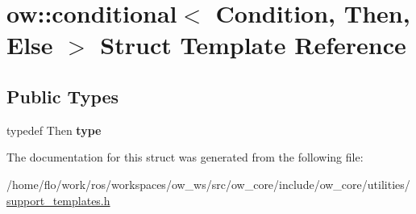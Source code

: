 \hypertarget{structow_1_1conditional}{}\section{ow\+:\+:conditional$<$ Condition, Then, Else $>$ Struct Template Reference}
\label{structow_1_1conditional}
\subsection*{Public Types}
\begin{DoxyCompactItemize}
\item 
typedef Then {\bfseries type}\hypertarget{structow_1_1conditional_a7b51d022cc26591c0338e95e154f5c51}{}\label{structow_1_1conditional_a7b51d022cc26591c0338e95e154f5c51}

\end{DoxyCompactItemize}


The documentation for this struct was generated from the following file\+:\begin{DoxyCompactItemize}
\item 
/home/flo/work/ros/workspaces/ow\+\_\+ws/src/ow\+\_\+core/include/ow\+\_\+core/utilities/\hyperlink{support__templates_8h}{support\+\_\+templates.\+h}\end{DoxyCompactItemize}
